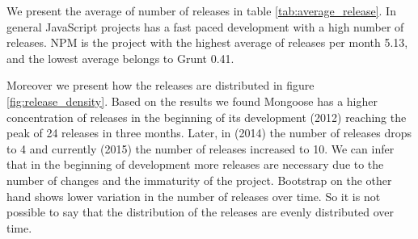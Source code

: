 \vspace{1 mm}
 We present the average of number of releases in table \ref{tab:average_release}. In general JavaScript projects has a fast paced development with a high number of releases. NPM is the project with the highest average of releases per month 5.13, and the lowest average belongs to Grunt 0.41. 

Moreover we present how the releases are distributed in figure \ref{fig:release_density}. Based on the results we found Mongoose has a higher concentration of releases in the beginning of its development (2012) reaching the peak of 24 releases in three months. Later, in (2014) the number of releases drops to 4 and currently (2015) the number of releases increased to 10. We can infer that in the beginning of development more releases are necessary due to the number of changes and the immaturity of the project. Bootstrap on the other hand shows lower variation in the number of releases over time. So it is not possible to say that the distribution of the releases are evenly distributed over time. 


